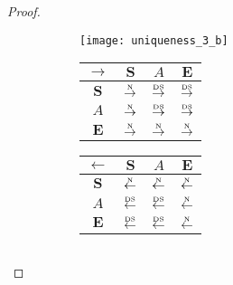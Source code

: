 \begin{proof}
\begin{figure}[htbp]
  \begin{subfigure}{1\textwidth}
    \vspace{1em}
    \centering
    \begin{minipage}[b]{1\textwidth}
      \centering
      \texttt{[image: uniqueness\_3\_b]}
    \end{minipage}
    \begin{minipage}[b]{0.3\textwidth}
      \vspace{1em}
      \centering
      \begin{tabular}{|c|c|c|c|} \hline
        $\rightarrow$ & $\bm{S}$ & $A$ & $\bm{E}$\\ \hline
        $\bm{S}$ & $\overset{\text{\tiny{N}}}{\rightarrow}$ & $\overset{\text{\tiny{DS}}}{\rightarrow}$ & $\overset{\text{\tiny{DS}}}{\rightarrow}$\\ \hline
        $A$ & $\overset{\text{\tiny{N}}}{\rightarrow}$ & $\overset{\text{\tiny{DS}}}{\rightarrow}$ & $\overset{\text{\tiny{DS}}}{\rightarrow}$\\ \hline
        $\bm{E}$ & $\overset{\text{\tiny{N}}}{\rightarrow}$ & $\overset{\text{\tiny{N}}}{\rightarrow}$ & $\overset{\text{\tiny{N}}}{\rightarrow}$\\ \hline
      \end{tabular}
    \end{minipage}
    \begin{minipage}[b]{0.3\textwidth}
      \vspace{1em}
      \centering
      \begin{tabular}{|c|c|c|c|} \hline
        $\leftarrow$ & $\bm{S}$ & $A$ & $\bm{E}$\\ \hline
        $\bm{S}$ & $\overset{\text{\tiny{N}}}{\leftarrow}$ & $\overset{\text{\tiny{N}}}{\leftarrow}$ & $\overset{\text{\tiny{N}}}{\leftarrow}$\\ \hline
        $A$ & $\overset{\text{\tiny{DS}}}{\leftarrow}$ & $\overset{\text{\tiny{DS}}}{\leftarrow}$ & $\overset{\text{\tiny{N}}}{\leftarrow}$\\ \hline
        $\bm{E}$ & $\overset{\text{\tiny{DS}}}{\leftarrow}$ & $\overset{\text{\tiny{DS}}}{\leftarrow}$ & $\overset{\text{\tiny{N}}}{\leftarrow}$\\ \hline
      \end{tabular}
    \end{minipage}
    \begin{minipage}[b]{0.3\textwidth}
      \vspace{1em}
      \centering
      \begin{tabular}{|c|c|c|c|} \hline

\end{tabular}
\end{minipage}
\end{subfigure}
\end{figure}
\end{proof}
